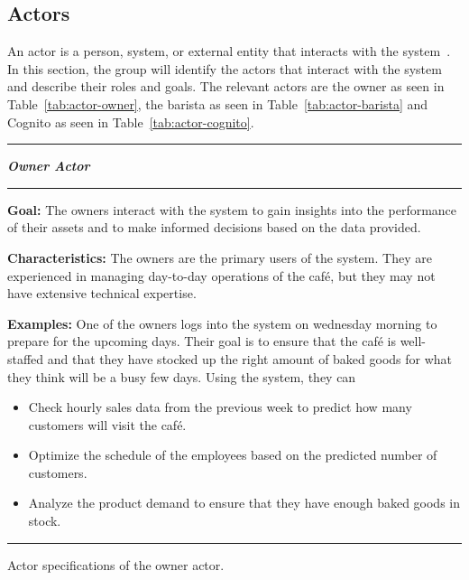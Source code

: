 \subsection{Actors}\label{subsec:actors}

An actor is a person, system, or external entity that interacts with the system~\cite{mathiassen2018}.
In this section, the group will identify the actors that interact with the system and describe their roles and goals.
The relevant actors are the owner as seen in Table~\ref{tab:actor-owner}, the barista as seen in
Table~\ref{tab:actor-barista} and Cognito as seen in Table~\ref{tab:actor-cognito}.

\begin{table}[H]
    \noindent
    \rule{\textwidth}{0.4pt}

    \begin{center}
    \noindent
    \textit{\textbf{Owner Actor}}
    \end{center}

    \noindent
    \rule{\textwidth}{0.4pt}
    \noindent

    \textbf{Goal:} The owners interact with the system to gain insights into the performance of their assets
    and to make informed decisions based on the data provided.
    \newline
    \noindent

    \textbf{Characteristics:} The owners are the primary users of the system.
    They are experienced in managing day-to-day operations of the café, but they may not have extensive technical
    expertise.
    \newline
    \noindent

    \textbf{Examples:} One of the owners logs into the system on wednesday morning to prepare for the upcoming days.
    Their goal is to ensure that the café is well-staffed and that they have stocked up the right amount of baked goods
    for what they think will be a busy few days.
    Using the system, they can

    \begin{itemize}
        \item Check hourly sales data from the previous week to predict how many customers will
        visit the café.
        \item Optimize the schedule of the employees based on the predicted number of customers.
        \item Analyze the product demand to ensure that they have enough baked goods in stock.
    \end{itemize}

    \noindent
    \rule{\textwidth}{0.4pt}
    \caption{Actor specifications of the owner actor.
    }\label{tab:actor-owner}
\end{table}

